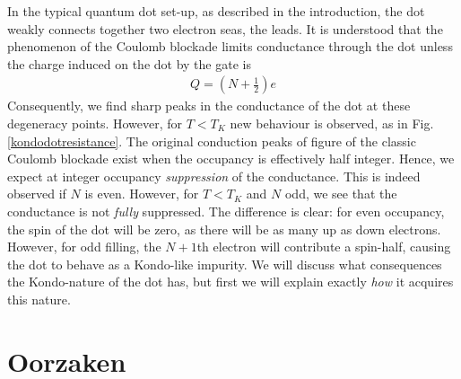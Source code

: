 \documentclass[11pt]{report}
\begin{document}
In the typical quantum dot set-up, as described in the introduction, the dot weakly connects together two electron seas, the leads.  It is understood that the phenomenon of the Coulomb blockade limits conductance through the dot unless the charge induced on the dot by the gate is
\begin{align}
  Q=\left(N+\frac{1}{2}\right)e
\end{align}
Consequently, we find sharp peaks in the conductance of the dot at these degeneracy points.  However, for $T<T_{K}$ new behaviour is observed, as in Fig. \ref{kondodotresistance}.  The original conduction peaks of figure of the classic Coulomb blockade exist when the occupancy is effectively half integer.  Hence, we expect at integer occupancy \emph{suppression} of the conductance.  This is indeed observed if $N$ is even.  However, for $T<T_{K}$ and $N$ odd, we see that the conductance is not \emph{fully} suppressed.  The difference is clear: for even occupancy, the spin of the dot will be zero, as there will be as many up as down electrons.  However, for odd filling, the $N+1$th electron will contribute a spin-half, causing the dot to behave as a Kondo-like impurity.  We will discuss what consequences the Kondo-nature of the dot has, but first we will explain exactly \emph{how} it acquires this nature.

\section{Oorzaken}
\end{document}
